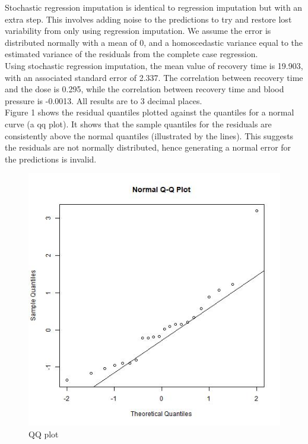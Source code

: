 \documentclass{article}
\numberwithin{equation}{section} %
\begin{document}
\vspace{5mm}
Stochastic regression imputation is identical to regression imputation but with an extra step. This involves adding 
noise to the predictions to try and restore lost variability from only using regression imputation. We assume the error is distributed normally with a mean of 0, and a homoscedastic variance equal to the estimated variance of the residuals from the complete case regression.
\\
Using stochastic regression imputation, the mean value of recovery time is 19.903, with an associated standard error of 2.337. The correlation between recovery time and the dose is 0.295, while the correlation between recovery time and blood pressure is -0.0013. All results are to 3 decimal places. 
\\
Figure 1 shows the residual quantiles plotted against the quantiles for a normal curve (a qq plot). It shows that the sample quantiles for the residuals are consistently above the normal quantiles (illustrated by the lines). This suggests the residuals are not normally distributed, hence generating a normal error for the predictions is invalid. 
\\
%
%
%
\begin{figure}[H]
	\includegraphics[scale=0.60]{qqplot.jpg}
	\caption{QQ plot}
\end{figure}
\newpage
\end{document}
